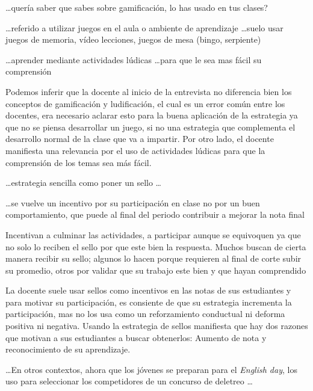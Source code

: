 \newenvironment{singlequote}
  {\quote\small\singlespacingNoVspace}
  {\endquote}


\begin{displayquote}
	\dots quería saber que sabes sobre gamificación, lo has usado en tus clases?

	\dots referido a utilizar juegos en el aula o ambiente de aprendizaje \dots suelo usar juegos de 
	memoria, vídeo lecciones, juegos de mesa (bingo, serpiente)

	\dots aprender mediante actividades lúdicas \dots para que le sea mas fácil su comprensión
\end{displayquote}

Podemos inferir que la docente al inicio de la entrevista no diferencia bien los conceptos de gamificación y 
ludificación, el cual es un error común entre los docentes, era necesario aclarar esto para la buena 
aplicación de la estrategia ya que no se piensa desarrollar un juego, si no una estrategia que complementa el 
desarrollo normal de la clase que va a impartir. Por otro lado, el docente manifiesta una relevancia por el 
uso de actividades lúdicas para que la comprensión de los temas sea más fácil.

\begin{displayquote}
	\dots estrategia sencilla como poner un sello \dots

	\dots se vuelve un incentivo por su participación en clase no por un buen comportamiento, que puede al 
	final del periodo contribuir a mejorar la nota final

	Incentivan a culminar las actividades, a participar aunque se equivoquen ya que no solo lo reciben el 
	sello por que este bien la respuesta. Muchos buscan de cierta manera recibir su sello; algunos lo 
	hacen porque requieren al final de corte subir su promedio, otros por validar que su trabajo este
	bien y que hayan comprendido
\end{displayquote}

La docente suele usar sellos como incentivos en las notas de sus estudiantes y para motivar su participación, 
es consiente de que su estrategia incrementa la participación, mas no los usa como un reforzamiento 
conductual ni deforma positiva ni negativa. Usando la estrategia de sellos manifiesta que hay dos razones que 
motivan a sus estudiantes a buscar obtenerlos: Aumento de nota y reconocimiento de su aprendizaje.

\begin{displayquote}
	\dots En otros contextos, ahora que los jóvenes se preparan para el \textit{English day}, los uso para 
	seleccionar los competidores de un concurso de deletreo \dots
\end{displayquote}

